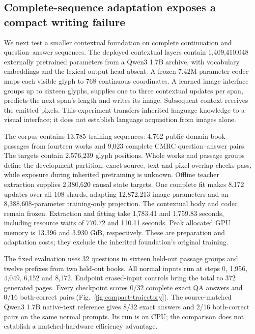 \subsection*{Complete-sequence adaptation exposes a compact writing failure}
We next test a smaller contextual foundation on complete continuation and
question--answer sequences. The deployed contextual layers contain 1,409,410,048
externally pretrained parameters from a Qwen3 1.7B archive\cite{qwen3}, with vocabulary
embeddings and the lexical output head absent. A frozen 7.42M-parameter codec
maps each visible glyph to 768 continuous coordinates. A learned image
interface groups up to sixteen glyphs, supplies one to three contextual
updates per span, predicts the next span's length and writes its image.
Subsequent context receives the emitted pixels. This experiment transfers
inherited language knowledge to a visual interface; it does not establish
language acquisition from images alone.

The corpus contains 13,785 training sequences: 4,762 public-domain book
passages from fourteen works and 9,023 complete CMRC question--answer pairs\cite{cmrc}.
The targets contain 2,576,239 glyph positions. Whole works and passage groups
define the development partition; exact source, text and pixel overlap checks
pass, while exposure during inherited pretraining is unknown. Offline teacher
extraction supplies 2,380,620 causal state targets. One complete fit makes
8,172 updates over all 108 shards, adapting 12,872,213 image parameters and
an 8,388,608-parameter training-only projection. The contextual body and codec
remain frozen. Extraction and fitting take 1,783.41 and 1,759.83 seconds,
including resource waits of 770.72 and 110.11 seconds. Peak allocated GPU
memory is 13.396 and 3.930 GiB, respectively. These are preparation and
adaptation costs; they exclude the inherited foundation's original training.

The fixed evaluation uses 32 questions in sixteen held-out passage groups and
twelve prefixes from two held-out books. All normal inputs run at steps 0,
1,956, 4,049, 6,152 and 8,172. Endpoint erased-input controls bring the total
to 372 generated pages. Every checkpoint scores 0/32 complete exact QA
answers and 0/16 both-correct pairs (Fig.~\ref{fig:compact-trajectory}).
The source-matched Qwen3 1.7B native-text reference gives 8/32 exact answers
and 2/16 both-correct pairs on the same normal prompts. Its run is on CPU;
the comparison does not establish a matched-hardware efficiency advantage.

